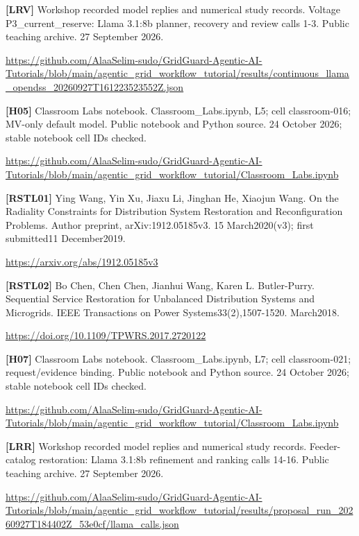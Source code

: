 \documentclass[12pt,letterpaper]{article}
\begin{document}
{\textbf{[LRV]} Workshop recorded model replies and numerical study records. Voltage P3\_\allowbreak{}current\_\allowbreak{}reserve: Llama 3.1:8b planner, recovery and review calls 1-3. Public teaching archive. 27 September 2026.\par\url{https://github.com/AlaaSelim-sudo/GridGuard-Agentic-AI-Tutorials/blob/main/agentic_grid_workflow_tutorial/results/continuous_llama_opendss_20260927T161223523552Z.json}\par\medskip
\textbf{[H05]} Classroom Labs notebook. Classroom\_\allowbreak{}Labs.ipynb, L5; cell classroom-016; MV-only default model. Public notebook and Python source. 24 October 2026; stable notebook cell IDs checked.\par\url{https://github.com/AlaaSelim-sudo/GridGuard-Agentic-AI-Tutorials/blob/main/agentic_grid_workflow_tutorial/Classroom_Labs.ipynb}\par\medskip
\textbf{[RSTL01]} Ying Wang, Yin Xu, Jiaxu Li, Jinghan He, Xiaojun Wang. On the Radiality Constraints for Distribution System Restoration and Reconfiguration Problems. Author preprint, arXiv:1912.05185v3. 15 March2020(v3); first submitted11 December2019.\par\url{https://arxiv.org/abs/1912.05185v3}\par\medskip
\textbf{[RSTL02]} Bo Chen, Chen Chen, Jianhui Wang, Karen L. Butler-Purry. Sequential Service Restoration for Unbalanced Distribution Systems and Microgrids. IEEE Transactions on Power Systems33(2),1507-1520. March2018.\par\url{https://doi.org/10.1109/TPWRS.2017.2720122}\par\medskip
\textbf{[H07]} Classroom Labs notebook. Classroom\_\allowbreak{}Labs.ipynb, L7; cell classroom-021; request/\allowbreak{}evidence binding. Public notebook and Python source. 24 October 2026; stable notebook cell IDs checked.\par\url{https://github.com/AlaaSelim-sudo/GridGuard-Agentic-AI-Tutorials/blob/main/agentic_grid_workflow_tutorial/Classroom_Labs.ipynb}\par\medskip
\textbf{[LRR]} Workshop recorded model replies and numerical study records. Feeder-catalog restoration: Llama 3.1:8b refinement and ranking calls 14-16. Public teaching archive. 27 September 2026.\par\url{https://github.com/AlaaSelim-sudo/GridGuard-Agentic-AI-Tutorials/blob/main/agentic_grid_workflow_tutorial/results/proposal_run_20260927T184402Z_53e0cf/llama_calls.json}\par\medskip
}
\end{document}

